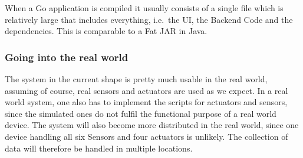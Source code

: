 When a Go application is compiled it usually consists of a single file
which is relatively large that includes everything, i.e.~the UI, the
Backend Code and the dependencies.
This is comparable to a Fat JAR in Java.


\subsubsection{Going into the real
world}\label{going-into-the-real-world}

The system in the current shape is pretty much usable in the real world,
assuming of course, real sensors and actuators are used as we expect.
In a real world
system, one also has to implement the scripts for actuators and
sensors, since the simulated ones do not fulfil the functional purpose of a real world device.
The system will also become more distributed in the real world, since one device handling all six Sensors and four actuators is unlikely.
The collection of data will therefore be handled in multiple locations.
